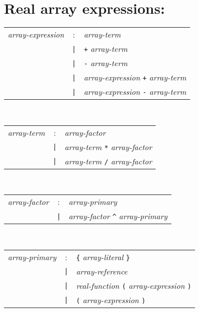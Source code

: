 \section*{Real array expressions:}
\begin{tabular}{p{4cm}cl}
\textit{array-expression}
  &:& \textit{array-term} \\
  &\texttt{|}& \texttt{+} \textit{array-term} \\
  &\texttt{|}& \texttt{-} \textit{array-term} \\
  &\texttt{|}& \textit{array-expression} \texttt{+} \textit{array-term} \\
  &\texttt{|}& \textit{array-expression} \texttt{-} \textit{array-term}
\end{tabular}
\\
\begin{tabular}{p{4cm}cl}
\textit{array-term}
  &:& \textit{array-factor} \\
  &\texttt{|}& \textit{array-term} \texttt{*} \textit{array-factor} \\
  &\texttt{|}& \textit{array-term} \texttt{/} \textit{array-factor}
\end{tabular}
\\
\begin{tabular}{p{4cm}cl}
\textit{array-factor}
  &:& \textit{array-primary} \\
  &\texttt{|}& \textit{array-factor} \texttt{\^{}} \textit{array-primary}
\end{tabular}
\\
\begin{tabular}{p{4cm}cl}
\textit{array-primary}
  &:& \texttt{\{} \textit{array-literal} \texttt{\}} \\
  &\texttt{|}& \textit{array-reference} \\
  &\texttt{|}& \textit{real-function}
    \texttt{(} \textit{array-expression} \texttt{)} \\
  &\texttt{|}& \texttt{(} \textit{array-expression} \texttt{)}
\end{tabular}
\\
